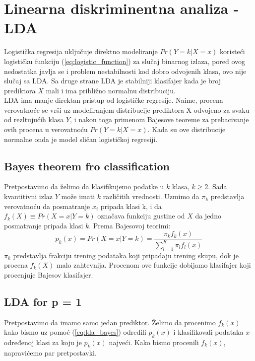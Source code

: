 \section{Linearna diskriminentna analiza - LDA}

Logistička regresija uključuje direktno modeliranje $Pr\left(Y=k | X = x\right)$
koristeći logističku funkciju (\ref{eq:logistic_function}) za slučaj binarnog
izlaza, pored ovog nedostatka javlja se i problem nestabilnosti kod dobro
odvojenih klasa, ovo nije slučaj sa LDA. Sa druge strane LDA je stabilniji
klasifajer kada je broj prediktora $X$ mali i ima približno normalnu
distribuciju. \\

LDA ima manje direktan pristup od logističke regresije. Naime, procena
verovatnoće se vrši uz modeliranjem distribucije prediktora X odvojeno za svaku
od rezltujućih klasa $Y$, i nakon toga primenom Bajesove teoreme za
prebacivanje ovih procena u verovatnoću $Pr\left(Y=k | X = x\right)$. Kada su
ove distribucije normalne onda je model sličan logističkoj regresiji. \\

\subsection{Bayes theorem fro classification}

Pretpostavimo da želimo da klasifikujemo podatke u $k$ klasa, $k \geq 2$. Sada
kvantitivni izlaz $Y$ može imati  $k$ različitih vrednosti. Uzmimo da $\pi_k$
predstavlja verovatnoću da posmatranje $x_i$ pripada klasi k, i da
$f_k\left(X\right) \equiv Pr\left(X=x | Y=k\right)$ označava funkciju gustine od $X$ da jedno
posmatranje pripada klasi $k$. Prema Bajesovoj teorimi:
\begin{equation} \label{eq:lda_bayes}
  p_k\left(x\right) = Pr(X=x | Y=k) =
  \frac
    {\pi_k f_k\left(x\right)}
    {\sum_{l=1}^{K}\pi_l f_l\left(x\right)}
\end{equation}
$\pi_k$ predstavlja frakciju trening podataka koji pripadaju trening skupu, dok
je procena $f_k\left(X\right)$ malo zahtevnija. Procenom ove funkcije dobijamo
klasifajer koji procenjuje Bajesov klasifajer.

\subsection{LDA for p = 1}
Pretpostavimo da imamo samo jedan prediktor. Želimo da procenimo
$f_k\left(x\right)$ kako bismo uz pomoć (\ref{eq:lda_bayes}) odredili
$p_k\left(x\right)$ i klasifikovali podataka $x$ određenoj klasi za koju je
$p_k\left(x\right)$ najveći. Kako bismo procenili $f_k\left(x\right)$,
napravićemo par pretpostavki. \\

